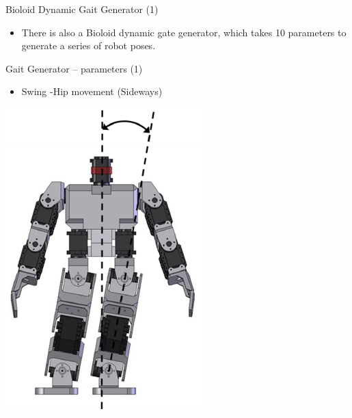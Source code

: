 \documentclass[compress]{beamer}
\begin{document}
\begin{frame}{Bioloid Dynamic Gait Generator (1)}

    \begin{itemize}

        \item There is also a Bioloid dynamic gate generator, which takes 10
            parameters to generate a series of robot poses.
    \end{itemize}

\end{frame}

\begin{frame}{Gait Generator -- parameters (1)}

    \begin{itemize}

        \item Swing -Hip movement (Sideways)
    \end{itemize}

    \begin{center}
        \includegraphics[height=0.5\paperheight]{bioloid-gait-1}
    \end{center}
\end{frame}
\end{document}
